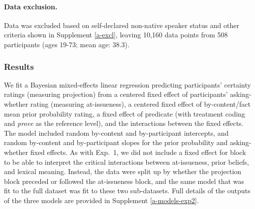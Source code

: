 \documentclass[11pt,fleqn]{article}
\newcommand{\6}{\mbox{$[\hspace*{-.6mm}[$}}
\newcommand{\9}{\mbox{$]\hspace*{-.6mm}]$}}
\begin{document}
\paragraph{Data exclusion.} Data was excluded based on self-declared non-native speaker status and other criteria shown in Supplement \ref{a-excl}, leaving 10,160 data points from 508 participants (ages 19-73; mean age: 38.3).

\subsubsection{Results}

We fit a Bayesian mixed-effects linear regression predicting participants' certainty ratings (measuring projection) from a centered fixed effect of participants' asking-whether rating (measuring at-issueness), a centered fixed effect of by-content/fact mean prior probability rating, a fixed effect of predicate (with treatment coding and {\em prove} as the reference level), and the interactions between the fixed effects. The model included random by-content and by-participant intercepts, and random by-content and by-participant slopes for the prior probability and asking-whether fixed effects. As with Exp.~1, we did not include a fixed effect for block to be able to interpret the critical interactions between at-issueness, prior beliefs, and lexical meaning. Instead, the data were split up by whether the projection block preceded or followed the at-issueness block, and the same model that was fit to the full dataset was fit to these two sub-datasets. Full details of the outputs of the three models are provided in Supplement \ref{a-models-exp2}. 

\end{document}
